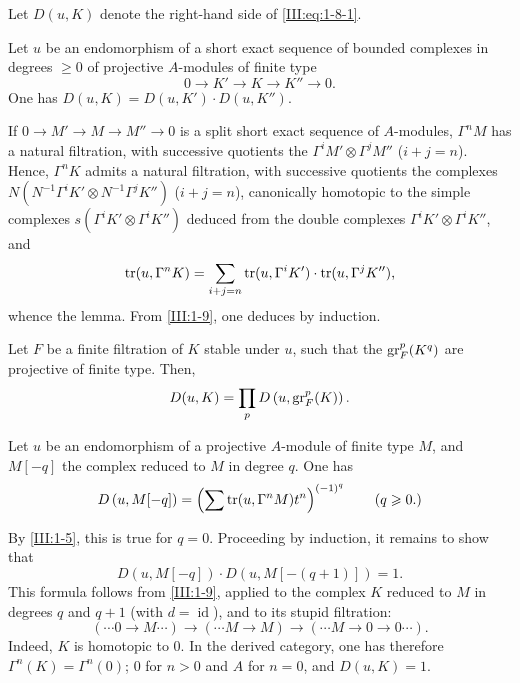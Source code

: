 Let $D(u,K)$ denote the right-hand side of \eqref{III:eq:1-8-1}.




\begin{lemma_}\label{III:1-9}
Let $u$ be an endomorphism of a short exact sequence of bounded complexes in
degrees $\geqslant 0$ of projective $A$-modules of finite type
\[
  0 \to K' \to K \to K'' \to 0 \text{.}
\]
One has $D(u,K)=D(u,K')\cdot D(u,K'')$.
\end{lemma_}

If $0\to M'\to M\to M''\to 0$ is a split short exact sequence of
$A$-modules, $\Gamma^n M$ has a natural filtration, with successive quotients
the $\Gamma^i M'\otimes \Gamma^j M''$ ($i+j=n$). Hence, $\Gamma^n K$ admits
a natural filtration, with successive quotients the complexes
$N(N^{-1} \Gamma^i K'\otimes N^{-1}\Gamma^j K'')$ ($i+j=n$), canonically
homotopic to the simple complexes $s(\Gamma^i K'\otimes \Gamma^i K'')$ deduced
from the double complexes $\Gamma^i K'\otimes \Gamma^i K''$, and
\[
  \operatorname{tr}(u,\Gamma^n K) = \sum_{i+j=n} \operatorname{tr}(u,\Gamma^i K')\cdot \operatorname{tr}(u,\Gamma^j K'') \text{,}
\]
whence the lemma. From \ref{III:1-9}, one deduces by induction.




\begin{lemma_}\label{III:1-10}
Let $F$ be a finite filtration of $K$ stable under $u$, such that the
$\operatorname{gr}_F^p(K^q)$ are projective of finite type. Then,
\[
  D(u,K) = \prod_p D\left(u,\operatorname{gr}_F^p(K)\right) \text{.}
\]
\end{lemma_}




\begin{lemma_}\label{III:1-11}
Let $u$ be an endomorphism of a projective $A$-module of finite type $M$, and
$M[-q]$ the complex reduced to $M$ in degree $q$. One has
\[
  D\left(u,M[-q]\right) = \left(\sum \operatorname{tr}(u,\Gamma^n M) t^n\right)^{(-1)^q} \qquad \text{($q\geqslant 0$.)}
\]
\end{lemma_}




By \ref{III:1-5}, this is true for $q=0$. Proceeding by induction, it
remains to show that
\[
  D\left(u,M[-q]\right) \cdot D\left(u,M[-(q+1)]\right) = 1 \text{.}
\]
This formula follows from \ref{III:1-9}, applied to the complex $K$ reduced to
$M$ in degrees $q$ and $q+1$ (with $d=\operatorname{id}$), and to its
stupid filtration:
\[
  (\cdots 0 \to M \cdots) \to (\cdots M \to M) \to (\cdots M \to 0 \to 0 \cdots) \text{.}
\]
Indeed, $K$ is homotopic to $0$. In the derived category, one has therefore
$\Gamma^n(K)=\Gamma^n(0)$; $0$ for $n>0$ and $A$ for $n=0$, and $D(u,K)=1$.




